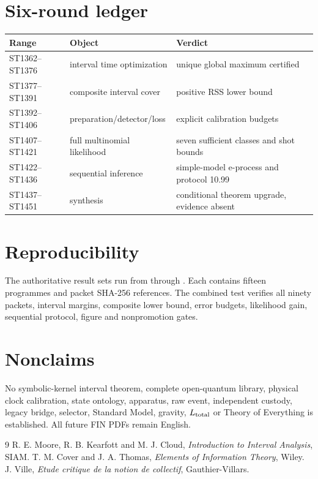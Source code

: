 \documentclass[11pt,a4paper]{article}
\begin{document}
\section{Six-round ledger}
\begin{longtable}{@{}p{}p{}p{}@{}}
\toprule
Range & Object & Verdict \\
\midrule\endhead
ST1362--ST1376 & interval time optimization & unique global maximum certified \\
ST1377--ST1391 & composite interval cover & positive RSS lower bound \\
ST1392--ST1406 & preparation/detector/loss & explicit calibration budgets \\
ST1407--ST1421 & full multinomial likelihood & seven sufficient classes and shot bounds \\
ST1422--ST1436 & sequential inference & simple-model e-process and protocol 10.99 \\
ST1437--ST1451 & synthesis & conditional theorem upgrade, evidence absent \\
\bottomrule
\end{longtable}

\section{Reproducibility}
The authoritative result sets run from
 through
.  Each contains fifteen programmes and
packet SHA-256 references.  The combined test
 verifies all ninety packets, interval margins,
composite lower bound, error budgets, likelihood gain, sequential protocol,
figure and nonpromotion gates.

\section{Nonclaims}
No symbolic-kernel interval theorem, complete open-quantum library, physical
clock calibration, state ontology, apparatus, raw event, independent custody,
legacy bridge, selector, Standard Model, gravity, $L_{\rm total}$ or Theory of
Everything is established.  All future FIN PDFs remain English.

\begin{thebibliography}{9}
 R. E. Moore, R. B. Kearfott and M. J. Cloud, \emph{Introduction to Interval Analysis}, SIAM.
 T. M. Cover and J. A. Thomas, \emph{Elements of Information Theory}, Wiley.
 J. Ville, \emph{Etude critique de la notion de collectif}, Gauthier-Villars.
\end{thebibliography}
\end{document}
